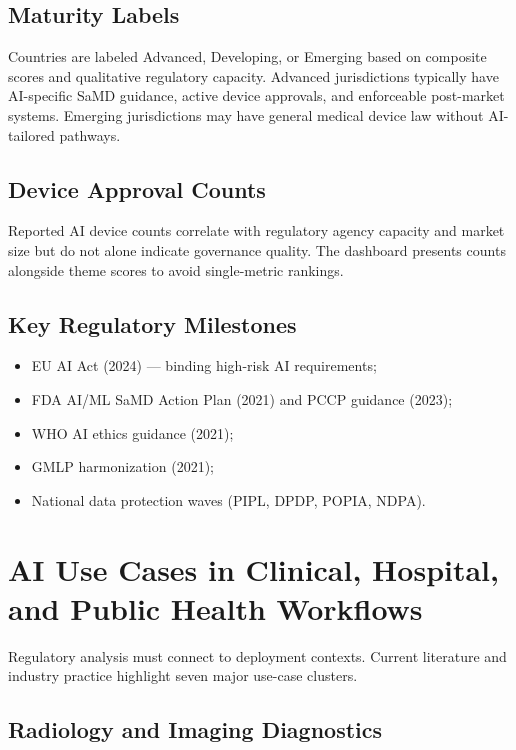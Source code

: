 \documentclass[12pt,a4paper]{report}
\begin{document}
\section{Maturity Labels}

Countries are labeled Advanced, Developing, or Emerging based on composite scores and qualitative regulatory capacity. Advanced jurisdictions typically have AI-specific SaMD guidance, active device approvals, and enforceable post-market systems. Emerging jurisdictions may have general medical device law without AI-tailored pathways.

\section{Device Approval Counts}

Reported AI device counts correlate with regulatory agency capacity and market size but do not alone indicate governance quality. The dashboard presents counts alongside theme scores to avoid single-metric rankings.

\section{Key Regulatory Milestones}

\begin{itemize}[noitemsep]
  \item EU AI Act (2024) --- binding high-risk AI requirements;
  \item FDA AI/ML SaMD Action Plan (2021) and PCCP guidance (2023);
  \item WHO AI ethics guidance (2021);
  \item GMLP harmonization (2021);
  \item National data protection waves (PIPL, DPDP, POPIA, NDPA).
\end{itemize}

\chapter{AI Use Cases in Clinical, Hospital, and Public Health Workflows}
\label{ch:usecases}

Regulatory analysis must connect to deployment contexts. Current literature and industry practice highlight seven major use-case clusters.

\section{Radiology and Imaging Diagnostics}
\end{document}
